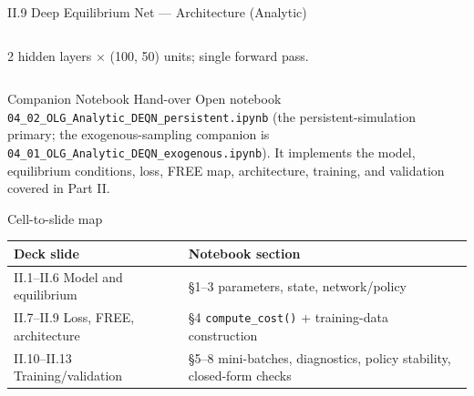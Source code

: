 \documentclass[aspectratio=169,11pt]{beamer}
\newcommand{\emphc}[1]{\textcolor{harvardcrimson}{#1}}
\begin{document}
\begin{frame}{II.9 Deep Equilibrium Net --- Architecture (Analytic)}
\begin{columns}[T,totalwidth=0.96\textwidth]

{\footnotesize 2 hidden layers $\times$ (100, 50) units; single forward pass.}
\end{columns}
\end{frame}


\begin{frame}{Companion Notebook Hand-over}
\scriptsize
\emphc{Open notebook \texttt{04\_02\_OLG\_Analytic\_DEQN\_persistent.ipynb}} (the persistent-simulation primary; the exogenous-sampling companion is \texttt{04\_01\_OLG\_Analytic\_DEQN\_exogenous.ipynb}).  It implements the model, equilibrium conditions, loss, FREE map, architecture, training, and validation covered in Part II.
\vspace{-2pt}
\begin{block}{Cell-to-slide map}
\vspace{-4pt}
\begin{center}\renewcommand{\arraystretch}{0.85}
{\scriptsize
\begin{tabular}{ll}
\toprule
\textbf{Deck slide} & \textbf{Notebook section} \\
\midrule
II.1--II.6 Model and equilibrium        & \S 1--3 \;parameters, state, network/policy \\
II.7--II.9 Loss, FREE, architecture     & \S 4 \;\texttt{compute\_cost()} + training-data construction \\
II.10--II.13 Training/validation        & \S 5--8 \;mini-batches, diagnostics, policy stability, closed-form checks \\
\bottomrule
\end{tabular}}
\end{center}
\vspace{-4pt}
\end{block}
\end{frame}
\end{document}
